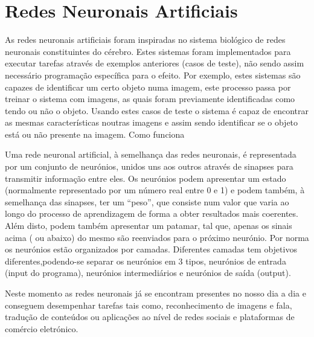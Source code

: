 \section{Redes Neuronais Artificiais}\label{sec:ArtificialNeuralNetwork}

 
As redes neuronais artificiais foram inspiradas no sistema biológico de redes neuronais constituintes do cérebro.
Estes sistemas foram implementados para executar tarefas através de exemplos anteriores (casos de teste), não sendo assim necessário programação específica para o efeito. Por exemplo, estes sistemas são capazes de identificar um certo objeto numa imagem, este processo passa por treinar o sistema com imagens, as quais foram previamente identificadas como tendo ou não o objeto. Usando estes casos de teste o sistema é capaz de encontrar as mesmas características noutras imagens e assim sendo identificar se o objeto está ou não presente na imagem.
Como funciona
 
Uma rede neuronal artificial, à semelhança das redes neuronais, é representada por um conjunto de neurónios, unidos uns aos outros através de sinapses para transmitir informação entre eles.
Os neurónios podem apresentar um estado (normalmente representado por um número real entre 0 e 1) e podem também, à semelhança das sinapses, ter um “peso”, que consiste num valor que varia ao longo do processo de aprendizagem de forma a obter resultados mais coerentes. Além disto, podem também apresentar um patamar, tal que, apenas os sinais acima ( ou abaixo) do mesmo são reenviados para o próximo neurónio.
Por norma os neurónios estão organizados por camadas. Diferentes camadas tem objetivos diferentes,podendo-se separar os neurónios em 3 tipos, neurónios de entrada (input do programa), neurónios intermediários e neurónios de saída (output).

Neste momento as redes neuronais já se encontram presentes no nosso dia a dia e conseguem desempenhar tarefas tais como, reconhecimento de imagens e fala, tradução de conteúdos ou aplicações ao nível de redes sociais e plataformas de comércio eletrónico.

